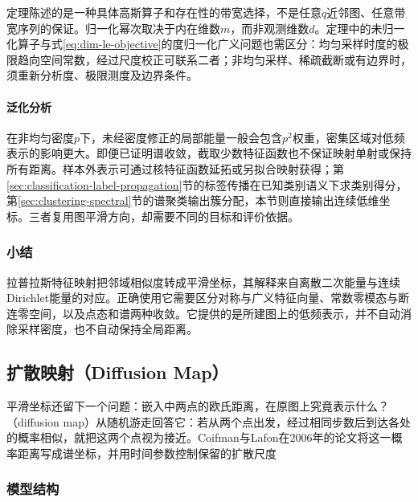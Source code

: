 定理陈述的是一种具体高斯算子和存在性的带宽选择，不是任意$q$近邻图、任意带宽序列的保证。归一化幂次取决于内在维数$m$，而非观测维数$d$。定理中的未归一化算子与式\eqref{eq:dim-le-objective}的度归一化广义问题也需区分：均匀采样时度的极限趋向空间常数，经过尺度校正可联系二者；非均匀采样、稀疏截断或有边界时，须重新分析度、极限测度及边界条件。

\paragraph{泛化分析}

在非均匀密度$p$下，未经密度修正的局部能量一般会包含$p^2$权重，密集区域对低频表示的影响更大。即便已证明谱收敛，截取少数特征函数也不保证映射单射或保持所有距离。样本外表示可通过核特征函数延拓或另拟合映射获得；第\ref{sec:classification-label-propagation}节的标签传播在已知类别语义下求类别得分，第\ref{sec:clustering-spectral}节的谱聚类输出簇分配，本节则直接输出连续低维坐标。三者复用图平滑方向，却需要不同的目标和评价依据。

\subsubsection{小结}

拉普拉斯特征映射把邻域相似度转成平滑坐标，其解释来自离散二次能量与连续Dirichlet能量的对应。正确使用它需要区分对称与广义特征向量、常数零模态与断连零空间，以及点态和谱两种收敛。它提供的是所建图上的低频表示，并不自动消除采样密度，也不自动保持全局距离。

\subsection{扩散映射（Diffusion Map）}
\label{sec:dim-diffusion}

平滑坐标还留下一个问题：嵌入中两点的欧氏距离，在原图上究竟表示什么？（diffusion map）从随机游走回答它：若从两个点出发，经过相同步数后到达各处的概率相似，就把这两个点视为接近。Coifman与Lafon在2006年的论文将这一概率距离写成谱坐标，并用时间参数控制保留的扩散尺度

\subsubsection{模型结构}

